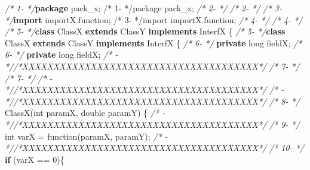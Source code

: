 \documentclass[
]{article}
\newenvironment{Shaded}{\begin{snugshade}}{\end{snugshade}}
\newcommand{\CommentTok}[1]{\textcolor[rgb]{0.56,0.35,0.01}{\textit{#1}}}
\newcommand{\DataTypeTok}[1]{\textcolor[rgb]{0.13,0.29,0.53}{#1}}
\newcommand{\DecValTok}[1]{\textcolor[rgb]{0.00,0.00,0.81}{#1}}
\newcommand{\FunctionTok}[1]{\textcolor[rgb]{0.00,0.00,0.00}{#1}}
\newcommand{\ImportTok}[1]{#1}
\newcommand{\KeywordTok}[1]{\textcolor[rgb]{0.13,0.29,0.53}{\textbf{#1}}}
\newcommand{\NormalTok}[1]{#1}
\begin{document}
\begin{landscape}

\small

\normalsize

\scriptsize

\begin{Shaded}
\begin{Highlighting}[]
\CommentTok{/*  1-   */}\KeywordTok{package}\ImportTok{ pack_x;                                          /*  1-   */package pack_x;}                                          
\CommentTok{/*  2-   */}                                                         \CommentTok{/*  2-   */}                                                         
\CommentTok{/*  3-   */}\KeywordTok{import}\ImportTok{ importX.function;                                 /*  3-   */import importX.function;}                                 
\CommentTok{/*  4-   */}                                                         \CommentTok{/*  4-   */}                                                         
\CommentTok{/*  5-   */}\KeywordTok{class}\NormalTok{ ClassX }\KeywordTok{extends}\NormalTok{ ClassY }\KeywordTok{implements}\NormalTok{ InterfX \{         }\CommentTok{/*  5-   */}\KeywordTok{class}\NormalTok{ ClassX }\KeywordTok{extends}\NormalTok{ ClassY }\KeywordTok{implements}\NormalTok{ InterfX \{         }
\CommentTok{/*  6-   */}    \KeywordTok{private} \DataTypeTok{long}\NormalTok{ fieldX;                                 }\CommentTok{/*  6-   */}    \KeywordTok{private} \DataTypeTok{long}\NormalTok{ fieldX;                                 }
\CommentTok{/*   -   *//*XXXXXXXXXXXXXXXXXXXXXXXXXXXXXXXXXXXXXX*/}               \CommentTok{/*  7-   */}                                                         
\CommentTok{/*  7-   */}                                                         \CommentTok{/*   -   *//*XXXXXXXXXXXXXXXXXXXXXXXXXXXXXXXXXXXXXX*/}               
\CommentTok{/*   -   *//*XXXXXXXXXXXXXXXXXXXXXXXXXXXXXXXXXXXXXX*/}               \CommentTok{/*  8-   */}    \FunctionTok{ClassX}\NormalTok{(}\DataTypeTok{int}\NormalTok{ paramX, }\DataTypeTok{double}\NormalTok{ paramY) \{                        }
\CommentTok{/*   -   *//*XXXXXXXXXXXXXXXXXXXXXXXXXXXXXXXXXXXXXX*/}               \CommentTok{/*  9-   */}        \DataTypeTok{int}\NormalTok{ varX = }\FunctionTok{function}\NormalTok{(paramX, paramY);                  }
\CommentTok{/*   -   *//*XXXXXXXXXXXXXXXXXXXXXXXXXXXXXXXXXXXXXX*/}               \CommentTok{/* 10-   */}        \KeywordTok{if}\NormalTok{ (varX == }\DecValTok{0}\NormalTok{)\{                                  }

\end{Highlighting}
\end{Shaded}
\end{landscape}
\end{document}
